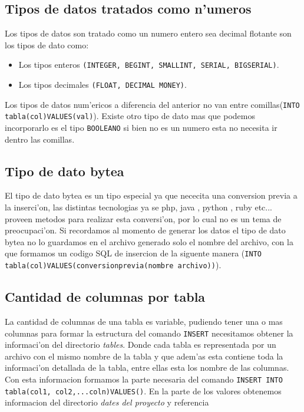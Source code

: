 \subsection{Tipos de datos tratados como n'umeros}
Los tipos de datos son tratado como un numero entero sea decimal flotante son los tipos de dato como:
\begin{itemize}
\item Los tipos enteros \texttt{(INTEGER, BEGINT, SMALLINT, SERIAL, BIGSERIAL)}.
\item Los tipos decimales \texttt{(FLOAT, DECIMAL MONEY)}.
\end{itemize}
Los tipos de datos num'ericos a diferencia del anterior no van entre comillas(\texttt{INTO tabla(col)VALUES(val)}).
Existe otro tipo de dato mas que podemos incorporarlo es el tipo \texttt{BOOLEANO} si bien no es un numero esta no necesita ir dentro las comillas.
\subsection{Tipo de dato bytea}
El tipo de dato bytea es un tipo especial ya que nececita una conversion previa a la inserci'on, las distintas tecnologias ya se php, java , python , ruby etc... proveen metodos para realizar esta conversi'on, por lo cual no es un tema de preocupaci'on. Si recordamos al momento de generar los datos el tipo de dato bytea no lo guardamos en el archivo generado solo el nombre del archivo, con la que formamos un codigo SQL de insercion de la siguente manera (\texttt{INTO tabla(col)VALUES(conversionprevia(nombre archivo))}).
\subsection{Cantidad de columnas por tabla}
La cantidad de columnas de una tabla es variable, pudiendo tener una o mas columnas para formar la estructura del comando \texttt{INSERT} necesitamos obtener la informaci'on del directorio \textit{tables}. Donde cada tabla es representada por un archivo con el mismo nombre de la tabla y que adem'as esta contiene toda la informaci'on detallada de la tabla, entre ellas esta los nombre de las columnas.
Con esta informacion formamos la parte necesaria del comando \texttt{INSERT INTO tabla(col1, col2,...coln)VALUES()}.
En la parte de los valores obtenemos informacion del directorio \textit{dates del proyecto} y referencia \cite{emifpgsql}

     